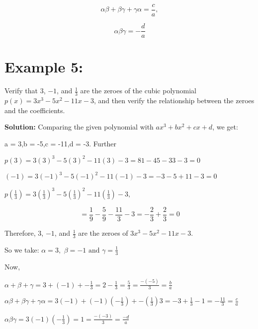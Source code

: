 \documentclass[12pt]{article}
\newcommand{\solution}{\noindent \textbf{Solution: }}
\begin{document}
\[\alpha\beta + \beta\gamma + \gamma\alpha = \frac{c}{a},\]


\[\alpha\beta\gamma = -\frac{d}{a}\]

\section*{Example 5:}
Verify that $3$, $-1$, and $\frac{1}{3}$ are the zeroes of the cubic polynomial $p(x) = 3x^3 - 5x^2 - 11x - 3$, and then verify the relationship between the zeroes and the coefficients.

\solution Comparing the given polynomial with $ax^3 + bx^2 + cx + d$, we get:

a = 3,b = -5,c = -11,d = -3. Further

\(p(3) = 3(3)^3 - 5(3)^2 - 11(3) - 3 = 81 - 45 - 33 - 3 = 0\)


\((-1) = 3(-1)^3 - 5(-1)^2 - 11(-1) - 3 = -3 - 5 + 11 - 3 = 0\)


\(p\left(\frac{1}{3}\right) = 3\left(\frac{1}{3}\right)^3 - 5\left(\frac{1}{3}\right)^2 - 11\left(\frac{1}{3}\right) - 3,\) 

\[=\frac{1}{9} - \frac{5}{9} - \frac{11}{3} - 3 = -\frac{2}{3}+\frac{2}{3}= 0\]

Therefore, $3$, $-1$, and $\frac{1}{3}$ are the zeroes of $3x^3 - 5x^2 - 11x - 3$. 

So we take: $\alpha = 3,$ $ \beta = -1 $ $\text{and}  $ $\gamma = \frac{1}{3}$

Now,


\quad \(\alpha + \beta + \gamma = 3 + (-1) + -\frac{1}{3} = 2-\frac{1}{3} = \frac{5}{3}=\frac{-(-5)}{3}=\frac{b}{a}\)


\quad \(\alpha\beta + \beta\gamma + \gamma\alpha = 3  (-1) + (-1) (-\frac{1}{3}) + -(\frac{1}{3})  3 = -3 + \frac{1}{3} - 1 = -\frac{11}{3} = \frac{c}{a} \)


\quad \(\alpha\beta\gamma = 3 (-1)  (-\frac{1}{3}) = 1  = \frac{-(-3)}{3}=\frac{-d}{a}\)
\end{document}

